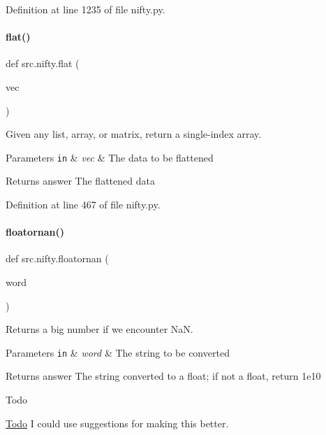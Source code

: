 Definition at line 1235 of file nifty.\+py.

\mbox{\label{namespacesrc_1_1nifty_ac5b7efc0b11b4fcbb7d0c37c97c4399d}} 
\paragraph{\texorpdfstring{flat()}{flat()}}
{\footnotesize\ttfamily def src.\+nifty.\+flat (\begin{DoxyParamCaption}\item[{}]{vec }\end{DoxyParamCaption})}



Given any list, array, or matrix, return a single-\/index array. 


\begin{DoxyParams}[1]{Parameters}
\mbox{\tt in}  & {\em vec} & The data to be flattened \\
\hline
\end{DoxyParams}
\begin{DoxyReturn}{Returns}
answer The flattened data 
\end{DoxyReturn}


Definition at line 467 of file nifty.\+py.

\mbox{\label{namespacesrc_1_1nifty_a1adc158bdcdb57c642f95d5e015bc881}} 
\paragraph{\texorpdfstring{floatornan()}{floatornan()}}
{\footnotesize\ttfamily def src.\+nifty.\+floatornan (\begin{DoxyParamCaption}\item[{}]{word }\end{DoxyParamCaption})}



Returns a big number if we encounter NaN. 


\begin{DoxyParams}[1]{Parameters}
\mbox{\tt in}  & {\em word} & The string to be converted \\
\hline
\end{DoxyParams}
\begin{DoxyReturn}{Returns}
answer The string converted to a float; if not a float, return 1e10 
\end{DoxyReturn}
\begin{DoxyRefDesc}{Todo}
\item[\hyperlink{todo__todo000011}{Todo}]I could use suggestions for making this better. \end{DoxyRefDesc}


